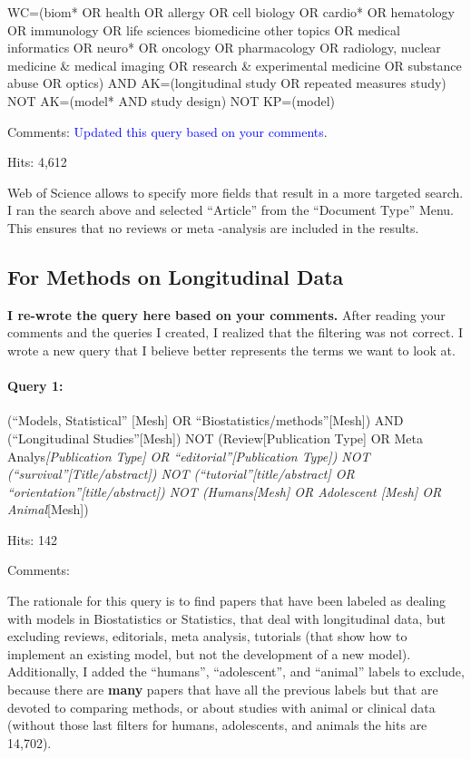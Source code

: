 \documentclass[
]{article}
\let\oldparagraph\paragraph
\renewcommand{\paragraph}[1]{\oldparagraph{#1}\mbox{}}
\begin{document}
WC=(biom* OR health OR allergy OR cell biology OR cardio* OR hematology
OR immunology OR life sciences biomedicine other topics OR medical
informatics OR neuro* OR oncology OR pharmacology OR radiology, nuclear
medicine \& medical imaging OR research \& experimental medicine OR
substance abuse OR optics) AND AK=(longitudinal study OR repeated
measures study) NOT AK=(model* AND study design) NOT KP=(model)

Comments: \textcolor{blue}{Updated this query based on your comments}.

Hits: 4,612

Web of Science allows to specify more fields that result in a more
targeted search. I ran the search above and selected ``Article'' from
the ``Document Type'' Menu. This ensures that no reviews or meta
-analysis are included in the results.

\hypertarget{for-methods-on-longitudinal-data}{%
\subsection{For Methods on Longitudinal
Data}\label{for-methods-on-longitudinal-data}}

\textbf{I re-wrote the query here based on your comments.} After reading
your comments and the queries I created, I realized that the filtering
was not correct. I wrote a new query that I believe better represents
the terms we want to look at.

\hypertarget{query-1-2}{%
\paragraph{Query 1:}\label{query-1-2}}

(``Models, Statistical'' {[}Mesh{]} OR
``Biostatistics/methods''{[}Mesh{]}) AND (``Longitudinal
Studies''{[}Mesh{]}) NOT (Review{[}Publication Type{]} OR Meta
Analys\emph{{[}Publication Type{]} OR ``editorial''{[}Publication
Type{]}) NOT (``survival''{[}Title/abstract{]}) NOT
(``tutorial''{[}title/abstract{]} OR
``orientation''{[}title/abstract{]}) NOT (Humans{[}Mesh{]} OR Adolescent
{[}Mesh{]} OR Animal}{[}Mesh{]})

Hits: 142

Comments:

The rationale for this query is to find papers that have been labeled as
dealing with models in Biostatistics or Statistics, that deal with
longitudinal data, but excluding reviews, editorials, meta analysis,
tutorials (that show how to implement an existing model, but not the
development of a new model). Additionally, I added the ``humans'',
``adolescent'', and ``animal'' labels to exclude, because there are
\textbf{many} papers that have all the previous labels but that are
devoted to comparing methods, or about studies with animal or clinical
data (without those last filters for humans, adolescents, and animals
the hits are 14,702).
\end{document}
